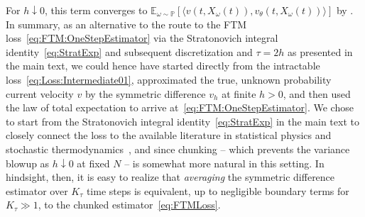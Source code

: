 \documentclass[oneside,11pt]{article}
\theoremstyle{remark}
\begin{document}
For $h \downarrow 0$, this term converges to $\mathbb{E}_{\omega \sim \mathbb{P}} \left[ \langle v(t, X_\omega(t)) , v_{\theta}(t, X_\omega(t))\rangle\right]$ by . In summary, as an alternative to the route to the FTM loss~\eqref{eq:FTM:OneStepEstimator} via the Stratonovich integral identity~\eqref{eq:StratExp} and subsequent discretization and $\tau = 2h$ as presented in the main text, we could hence have started directly from the intractable loss~\eqref{eq:Loss:Intermediate01}, approximated the true, unknown probability current velocity $v$ by the symmetric difference $v_h$ at finite $h > 0$, and then used the law of total expectation to arrive at~\eqref{eq:FTM:OneStepEstimator}. We chose to start from the Stratonovich integral identity~\eqref{eq:StratExp} in the main text to closely connect the loss to the available literature in statistical physics and stochastic thermodynamics~\cite{frishman-ronceray:2020,boffi-vanden-eijnden:2025,lyu-ray-crutchfield:2025}, and since chunking -- which prevents the variance blowup as $h \downarrow 0$ at fixed $N$ -- is somewhat more natural in this setting. In hindsight, then, it is easy to realize that \textit{averaging} the symmetric difference estimator over $K_\tau$ time steps is equivalent, up to negligible boundary terms for $K_\tau \gg 1$, to the chunked estimator~\eqref{eq:FTMLoss}.
\end{document}
